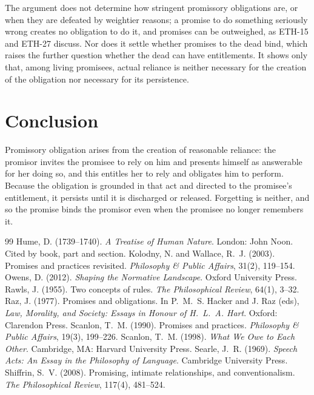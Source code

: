\documentclass{situationist-preprint}
\begin{document}
The argument does not determine how stringent promissory obligations are, or when they are defeated by weightier reasons; a promise to do something seriously wrong creates no obligation to do it, and promises can be outweighed, as ETH-15 and ETH-27 discuss. Nor does it settle whether promises to the dead bind, which raises the further question whether the dead can have entitlements. It shows only that, among living promisees, actual reliance is neither necessary for the creation of the obligation nor necessary for its persistence.

\section{Conclusion}

Promissory obligation arises from the creation of reasonable reliance: the promisor invites the promisee to rely on him and presents himself as answerable for her doing so, and this entitles her to rely and obligates him to perform. Because the obligation is grounded in that act and directed to the promisee's entitlement, it persists until it is discharged or released. Forgetting is neither, and so the promise binds the promisor even when the promisee no longer remembers it.

\begin{thebibliography}{99}\small
{} Hume, D. (1739--1740). \emph{A Treatise of Human Nature}. London: John Noon. Cited by book, part and section.
 Kolodny, N. and Wallace, R.~J. (2003). Promises and practices revisited. \emph{Philosophy \& Public Affairs}, 31(2), 119--154.
 Owens, D. (2012). \emph{Shaping the Normative Landscape}. Oxford University Press.
 Rawls, J. (1955). Two concepts of rules. \emph{The Philosophical Review}, 64(1), 3--32.
 Raz, J. (1977). Promises and obligations. In P.~M.~S. Hacker and J. Raz (eds), \emph{Law, Morality, and Society: Essays in Honour of H.~L.~A. Hart}. Oxford: Clarendon Press.
 Scanlon, T.~M. (1990). Promises and practices. \emph{Philosophy \& Public Affairs}, 19(3), 199--226.
 Scanlon, T.~M. (1998). \emph{What We Owe to Each Other}. Cambridge, MA: Harvard University Press.
 Searle, J.~R. (1969). \emph{Speech Acts: An Essay in the Philosophy of Language}. Cambridge University Press.
 Shiffrin, S.~V. (2008). Promising, intimate relationships, and conventionalism. \emph{The Philosophical Review}, 117(4), 481--524.
\end{thebibliography}
\end{document}
